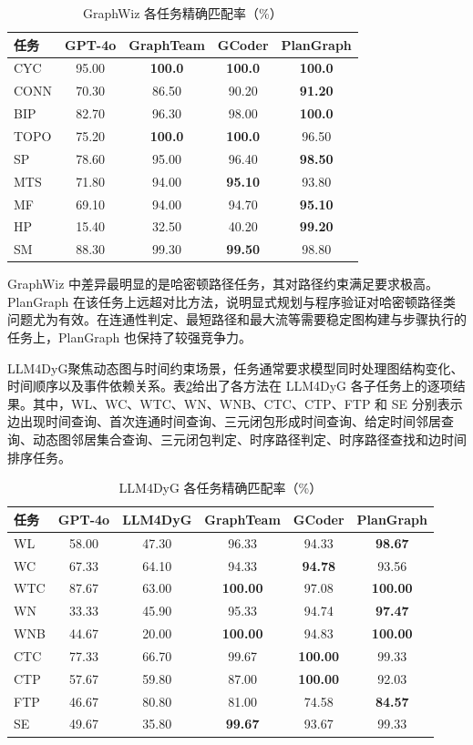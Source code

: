 \begin{table}[htbp]
\centering
\caption{GraphWiz 各任务精确匹配率（\%）}
\label{tab:graphwiz_detail}
\begin{tabular}{lcccc}
\toprule
任务 & GPT-4o & GraphTeam & GCoder & PlanGraph \\
\midrule
CYC & 95.00 & \textbf{100.0} & \textbf{100.0} & \textbf{100.0} \\
CONN & 70.30 & 86.50 & 90.20 & \textbf{91.20} \\
BIP & 82.70 & 96.30 & 98.00 & \textbf{100.0} \\
TOPO & 75.20 & \textbf{100.0} & \textbf{100.0} & 96.50 \\
SP & 78.60 & 95.00 & 96.40 & \textbf{98.50} \\
MTS & 71.80 & 94.00 & \textbf{95.10} & 93.80 \\
MF & 69.10 & 94.00 & 94.70 & \textbf{95.10} \\
HP & 15.40 & 32.50 & 40.20 & \textbf{99.20} \\
SM & 88.30 & 99.30 & \textbf{99.50} & 98.80 \\
\bottomrule
\end{tabular}
\end{table}

GraphWiz 中差异最明显的是哈密顿路径任务，其对路径约束满足要求极高。PlanGraph 在该任务上远超对比方法，说明显式规划与程序验证对哈密顿路径类问题尤为有效。在连通性判定、最短路径和最大流等需要稳定图构建与步骤执行的任务上，PlanGraph 也保持了较强竞争力。

LLM4DyG\cite{llm4dyg2024}聚焦动态图与时间约束场景，任务通常要求模型同时处理图结构变化、时间顺序以及事件依赖关系。表\ref{tab:llm4dyg_detail}给出了各方法在 LLM4DyG 各子任务上的逐项结果。其中，WL、WC、WTC、WN、WNB、CTC、CTP、FTP 和 SE 分别表示边出现时间查询、首次连通时间查询、三元闭包形成时间查询、给定时间邻居查询、动态图邻居集合查询、三元闭包判定、时序路径判定、时序路径查找和边时间排序任务。

\begin{table}[htbp]
\centering
\small
\caption{LLM4DyG 各任务精确匹配率（\%）}
\label{tab:llm4dyg_detail}
\begin{tabular}{lccccc}
\toprule
任务 & GPT-4o & LLM4DyG & GraphTeam & GCoder & PlanGraph \\
\midrule
WL & 58.00 & 47.30 & 96.33 & 94.33 & \textbf{98.67} \\
WC & 67.33 & 64.10 & 94.33 & \textbf{94.78} & 93.56 \\
WTC & 87.67 & 63.00 & \textbf{100.00} & 97.08 & \textbf{100.00} \\
WN & 33.33 & 45.90 & 95.33 & 94.74 & \textbf{97.47} \\
WNB & 44.67 & 20.00 & \textbf{100.00} & 94.83 & \textbf{100.00} \\
CTC & 77.33 & 66.70 & 99.67 & \textbf{100.00} & 99.33 \\
CTP & 57.67 & 59.80 & 87.00 & \textbf{100.00} & 92.03 \\
FTP & 46.67 & 80.80 & 81.00 & 74.58 & \textbf{84.57} \\
SE & 49.67 & 35.80 & \textbf{99.67} & 93.67 & 99.33 \\
\bottomrule
\end{tabular}
\end{table}

